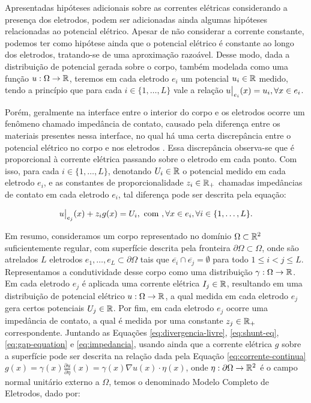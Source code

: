 Apresentadas hipóteses adicionais sobre as correntes elétricas considerando a presença dos eletrodos, podem ser adicionadas ainda algumas hipóteses relacionadas ao potencial elétrico. Apesar de não considerar a corrente constante, podemos ter como hipótese ainda que o potencial  elétrico é constante ao longo dos eletrodos, tratando-se de uma aproximação razoável. Desse modo, dada a distribuição de potencial gerada sobre o corpo, também modelada como uma função $u: \Omega \to \mathbb{R}$, teremos em cada eletrodo $e_i$ um potencial $u_i \in \mathbb{R}$ medido, tendo a princípio que para cada $i\in \{1,\dots,L\}$ vale a relação $u\big |_{e_i}(x)=u_i, \forall x \in e_i$. 

Porém, geralmente na interface entre o interior do corpo e os eletrodos ocorre um fenômeno chamado impedância de contato, causado pela diferença entre os materiais presentes nessa interface, no qual há uma certa discrepância entre o potencial elétrico no corpo e nos eletrodos \cite{somersalo}. Essa discrepância observa-se que é proporcional à corrente elétrica passando sobre o eletrodo em cada ponto. Com isso, para cada $i \in \{1,\dots, L\}$, denotando $U_i\in \mathbb{R}$ o potencial medido em cada eletrodo $e_i$, e as constantes de proporcionalidade $z_i\in \mathbb{R}_+$ chamadas impedâncias de contato em cada eletrodo $e_i$, tal diferença pode ser descrita pela equação:

\begin{equation}\label{eq:impedancia}
u\big |_{e_j}(x) + z_i g(x) = U_i, \text{ com }, \forall x \in e_i, \forall i \in \{1,\dots, L\}.
\end{equation}

 Em resumo, consideramos um corpo representado no domínio $\Omega\subset \mathbb{R}^2$ suficientemente regular, com superfície descrita pela fronteira $\partial \Omega \subset \Omega$, onde são atrelados $L$ eletrodos $e_1,\dots, e_L \subset \partial\Omega$ tais que $\overline{e_i} \cap \overline{e_j} = \emptyset$ para todo $1\leq i<j \leq L$. Representamos a condutividade desse corpo como uma distribuição $\gamma : \Omega \to \mathbb{R}$. Em cada eletrodo $e_j$ é aplicada uma corrente elétrica $I_j\in \mathbb{R}$, resultando em uma distribuição de potencial elétrico $u :\Omega \to \mathbb{R}$, a qual medida em cada eletrodo $e_j$ gera certos potenciais $U_j\in \mathbb{R}$. Por fim, em cada eletrodo $e_j$ ocorre uma impedância de contato, a qual é medida por uma constante $z_j \in \mathbb{R}_+$ correspondente. Juntando as Equações \eqref{eq:divergencia-livre}, \eqref{eq:shunt-eq}, \eqref{eq:gap-equation} e \eqref{eq:impedancia}, usando ainda que a corrente elétrica $g$ sobre a superfície pode ser descrita na relação dada pela Equação \eqref{eq:corrente-continua} $g(x) = \gamma(x) \frac{\partial u}{\partial \eta}(x) = \gamma(x) \nabla u(x) \cdot \eta(x)$, onde $\eta: \partial \Omega \to \mathbb{R}^2$ é o campo normal unitário externo a $\Omega$, temos o denominado Modelo Completo de Eletrodos, dado por:

